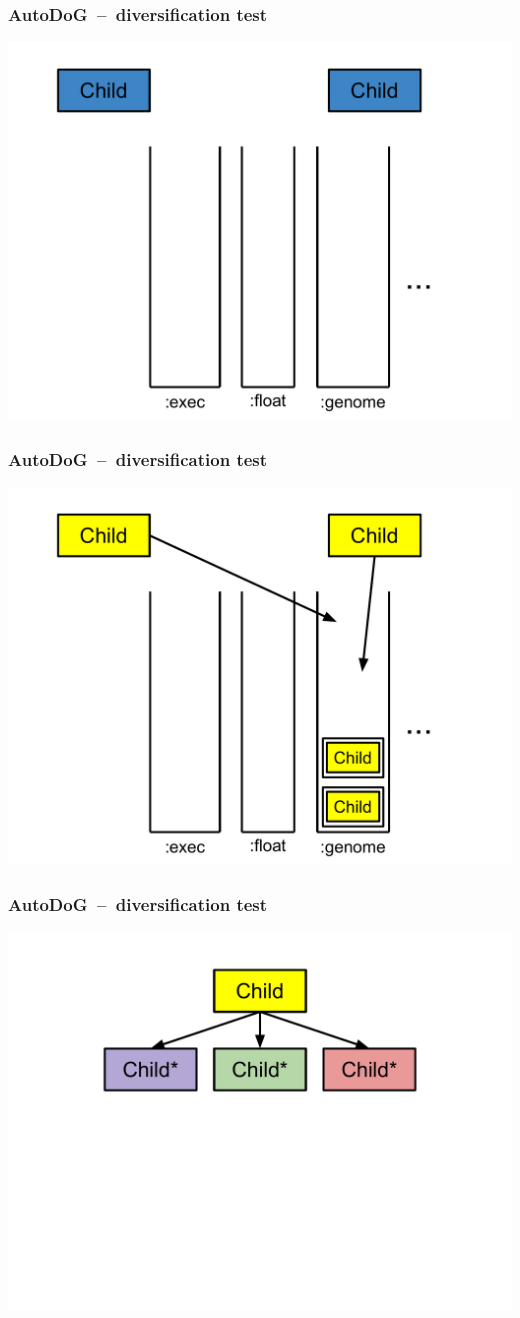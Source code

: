\documentclass{beamer}
\begin{document}
\begin{frame}
	\frametitle{AutoDoG~--~diversification test}
	\includegraphics[width=.9\textwidth]{Illustrations/test_2.PDF}
\end{frame}

\begin{frame}
	\frametitle{AutoDoG~--~diversification test}
	\includegraphics[width=.9\textwidth]{Illustrations/test_3.PDF}
\end{frame}

\begin{frame}
	\frametitle{AutoDoG~--~diversification test}
	\includegraphics[width=.9\textwidth]{Illustrations/test_4.PDF}
\end{frame}
\end{document}
